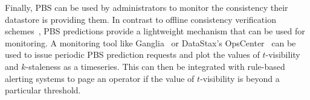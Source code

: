 
Finally, PBS can be used by administrators to monitor the consistency their
datastore is providing them. In contrast to offline consistency
verification schemes~\cite{podc-hpl}, PBS predictions provide a
lightweight mechanism that can be used for monitoring. A monitoring
tool like Ganglia~\cite{massie2004ganglia} or DataStax's
OpsCenter~\cite{datastax-opscenter} can be used to issue periodic PBS
prediction requests and plot the values of $t$-visibility and
$k$-staleness as a timeseries. This can then be integrated with
rule-based alerting systems to page an operator if the value of
$t$-visibility is beyond a particular threshold.
